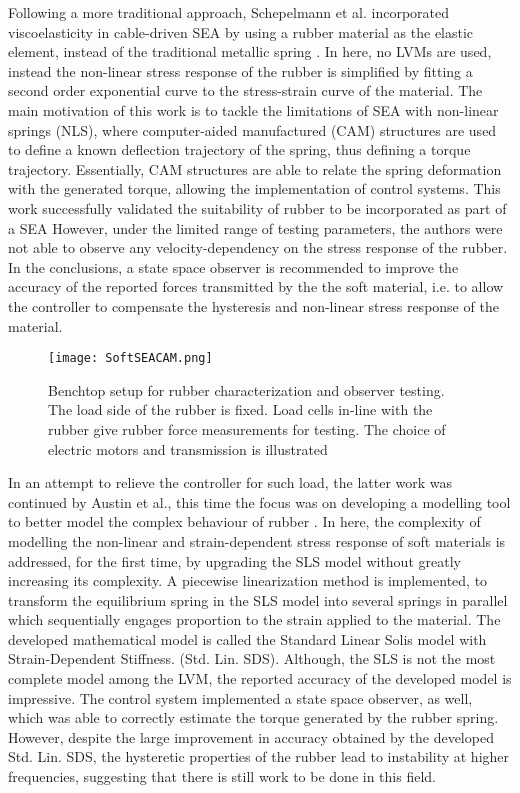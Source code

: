 Following a more traditional approach, Schepelmann et al. incorporated viscoelasticity in cable-driven SEA by using a rubber material as the elastic element, instead of the traditional metallic spring \cite{schepelmann2014compact}. In here, no LVMs are used, instead the non-linear stress response of the rubber is simplified by fitting a second order exponential curve to the stress-strain curve of the material. The main motivation of this work is to tackle the limitations of SEA with non-linear springs (NLS), where computer-aided manufactured (CAM) structures are used to define a known deflection trajectory of the spring, thus defining a torque trajectory. Essentially, CAM structures are able to relate the spring deformation with the generated torque, allowing the implementation of control systems. This work successfully validated the suitability of rubber to be incorporated as part of a SEA However, under the limited range of testing parameters, the authors were not able to observe any velocity-dependency on the stress response of the rubber. In the conclusions, a state space observer is recommended to improve the accuracy of the reported forces transmitted by the the soft material, i.e. to allow the controller to compensate the hysteresis and non-linear stress response of the material.

\begin{figure}[htb!]
    \centering
    \texttt{[image: SoftSEACAM.png]}
    \caption{Benchtop setup for rubber characterization and observer testing. The load side of the rubber is fixed. Load cells in-line with the rubber give rubber force measurements for testing. The choice of electric motors and transmission is illustrated \cite{schepelmann2014compact}}
    \label{fig:softSEACAM}
\end{figure}

In an attempt to relieve the controller for such load, the latter work was continued by Austin et al., this time the focus was on developing a modelling tool to better model the complex behaviour of rubber \cite{austin2015control}. In here, the complexity of modelling the non-linear and strain-dependent stress response of soft materials is addressed, for the first time, by upgrading the SLS model without greatly increasing its complexity. A piecewise linearization method is implemented, to transform the equilibrium spring in the SLS model into several springs in parallel which sequentially engages proportion to the strain applied to the material. The developed mathematical model is called the Standard Linear Solis model with Strain-Dependent Stiffness. (Std. Lin. SDS). Although, the SLS is not the most complete model among the LVM, the reported accuracy of the developed model is impressive. The control system implemented a state space observer, as well, which was able to correctly estimate the torque generated by the rubber spring. However, despite the large improvement in accuracy obtained by the developed Std. Lin. SDS, the hysteretic properties of the rubber  lead to instability at higher frequencies, suggesting that there is still work to be done in this field.

